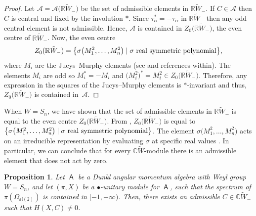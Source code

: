 \documentclass[pdftex]{sigma}
\numberwithin{equation}{section}
\newtheorem{Proposition}[Theorem]{Proposition}
 { \theoremstyle{definition}
\newtheorem{Definition}[Theorem]{Definition}
\newtheorem{Note}[Theorem]{Note}
\newtheorem{Example}[Theorem]{Example}
\newtheorem{Remark}[Theorem]{Remark} }
\newcommand{\bbc}{\mathbb{C}}
\newcommand{\bbr}{\mathbb{R}}
\DeclareMathOperator{\ama}{\mathsf{A}}
\begin{document}
\begin{proof} Let $\mathcal{A} =\mathcal{A}\big(\bbr\tilde{W}_-\big)$ be the set of admissible elements in $\bbr \tilde{W}_-$. If $C \in \mathcal{A}$ then $C$ is central and fixed by the involution $*$. Since $\tau_\alpha^* = -\tau_\alpha$ in $\bbr\tilde{W}_-$ then any odd central element is not admissible. Hence, $\mathcal{A}$ is contained in $Z_0\big(\bbr\tilde{W}_-\big)$, the even centre of $\bbr\tilde{W}_-$. Now, the even centre
\[Z_0(\bbr\tilde{W}_-)=\big\{\sigma\big(M_1^2,\dots,M_n^2\big)\mid \sigma \textup{ real symmetric polynomial}\big\},
\] where $M_i$ are the Jucys--Murphy elements (see \cite[Lemma~13.1.2, Remark~13.1.3]{K05} and references within). The elements $M_i$ are odd so $M_i^*= -M_i$ and $\big(M_i^2\big)^*=M_i^2\in Z_0\big(\bbr\tilde{W}_-\big)$. Therefore, any expression in the squares of the Jucys--Murphy elements is $*$-invariant and thus, $Z_0\big(\bbr\tilde{W}_-\big)$ is contained in~$\mathcal{A}$.
\end{proof}

\begin{Remark}\label{r:actionofC}
When $W=S_n$, we have shown that the set of admissible elements in $\bbr\tilde{W}_-$ is equal to the even centre $Z_0\big(\bbr\tilde{W}
_-\big)$.
From \cite{K05}, $Z_0\big(\bbr\tilde{W}_-\big)$ is equal to $\big\{\sigma\big(M_1^2,\dots,M_n^2\big)\mid \sigma \textup{ real symmetric polynomial}\big\}$. The element $\sigma\big(M_1^2,\dots,M_n^2\big)$ acts on an irreducible representation by evaluating $\sigma$ at specific real values \cite[Corollary~6.3]{C18}. In particular, we can conclude that for every $\bbc\tilde{W}$-module there is an admissible element that does not act by zero.
\end{Remark}

\begin{Proposition}\label{p:nonzerocoh}
Let $\ama$ be a Dunkl angular momentum algebra with Weyl group $W=S_n$, and let $(\pi,X)$ be a $\bullet$-unitary module for $\ama$, such that the spectrum of $\pi(\Omega_{\mathfrak{sl}(2)})$ is contained in $[-1, + \infty)$. Then, there exists an admissible $C \in \bbc \tilde{W}_-$ such that $H(X,C) \neq 0$.
\end{Proposition}
\end{document}

